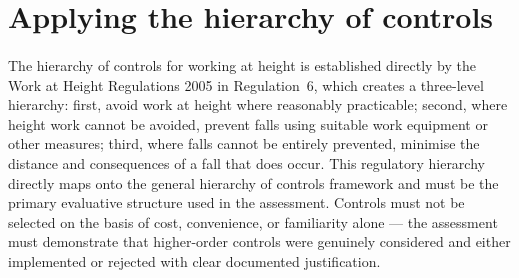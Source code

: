 \section{Applying the hierarchy of controls}
\label{sec:wah_hierarchy}

\paragraph{}
The hierarchy of controls for working at height is established directly by the Work at Height Regulations 2005 in Regulation~6, which creates a three-level hierarchy: first, avoid work at height where reasonably practicable; second, where height work cannot be avoided, prevent falls using suitable work equipment or other measures; third, where falls cannot be entirely prevented, minimise the distance and consequences of a fall that does occur. This regulatory hierarchy directly maps onto the general hierarchy of controls framework and must be the primary evaluative structure used in the assessment. Controls must not be selected on the basis of cost, convenience, or familiarity alone --- the assessment must demonstrate that higher-order controls were genuinely considered and either implemented or rejected with clear documented justification.

